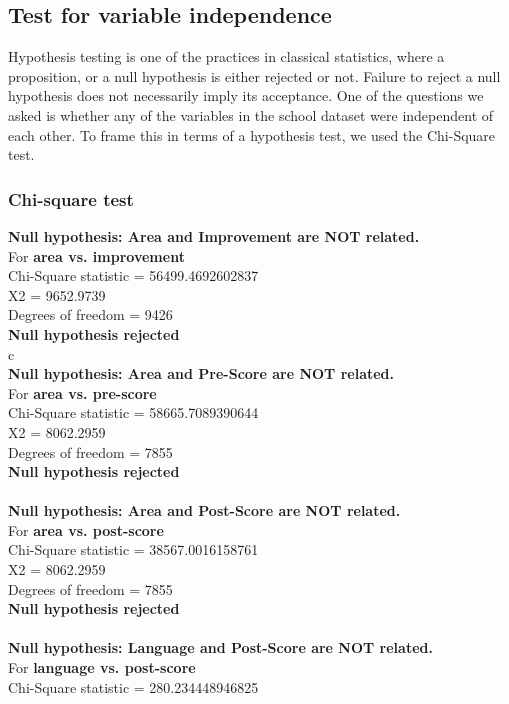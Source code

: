 \documentclass[10pt]{article}
\begin{document}
\subsection{Test for variable independence}
Hypothesis testing is one of the practices in classical statistics, where a proposition, or a null hypothesis is either rejected or not. Failure to reject a null hypothesis does not necessarily imply its acceptance. One of the questions we asked is whether any of the variables in the school dataset were independent of each other. To frame this in terms of a hypothesis test, we used the Chi-Square test.
\subsubsection{Chi-square test}
\textbf{Null hypothesis: Area and Improvement are NOT related.} \\
 For \textbf{area vs. improvement}\\
 Chi-Square statistic = 56499.4692602837\\
 X2 = 9652.9739\\
 Degrees of freedom = 9426\\
 \textbf{Null hypothesis rejected}\\c
\\
\textbf{Null hypothesis: Area and Pre-Score are NOT related.}\\
 For \textbf{area vs. pre-score}\\
 Chi-Square statistic = 58665.7089390644\\
 X2 = 8062.2959\\
 Degrees of freedom = 7855\\
 \textbf{Null hypothesis rejected}\\
\\
\textbf{Null hypothesis: Area and Post-Score are NOT related.}\\
 For \textbf{area vs. post-score}\\
 Chi-Square statistic = 38567.0016158761\\
 X2 = 8062.2959\\
 Degrees of freedom = 7855\\
 \textbf{Null hypothesis rejected}\\
\\
\textbf{Null hypothesis: Language and Post-Score are NOT related.}\\
 For \textbf{language vs. post-score}\\
 Chi-Square statistic = 280.234448946825\\
\end{document}
